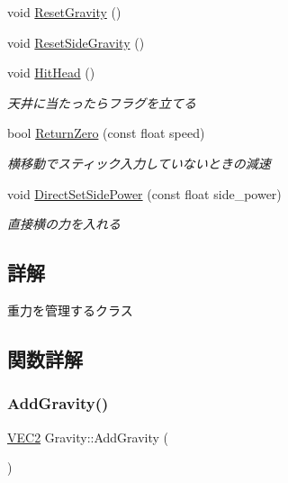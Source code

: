 \begin{DoxyCompactItemize}
void \mbox{\hyperlink{class_gravity_aa334a7ebbbd79ca28e7d29c3fc5c03ed}{Reset\+Gravity}} ()
\item 
void \mbox{\hyperlink{class_gravity_a5e430e10dea748f20c2d019e86dd339c}{Reset\+Side\+Gravity}} ()
\item 
void \mbox{\hyperlink{class_gravity_a56fa68b18b0426bdb267850e1917eb05}{Hit\+Head}} ()
\begin{DoxyCompactList}\small\item\em 天井に当たったらフラグを立てる \end{DoxyCompactList}\item 
bool \mbox{\hyperlink{class_gravity_a1efc862b822ca8cfea80b066ed4479f9}{Return\+Zero}} (const float speed)
\begin{DoxyCompactList}\small\item\em 横移動でスティック入力していないときの減速 \end{DoxyCompactList}\item 
void \mbox{\hyperlink{class_gravity_a015bda4dc0019baaa70378e1d6715a55}{Direct\+Set\+Side\+Power}} (const float side\+\_\+power)
\begin{DoxyCompactList}\small\item\em 直接横の力を入れる \end{DoxyCompactList}\end{DoxyCompactItemize}


\subsection{詳解}
重力を管理するクラス 

\subsection{関数詳解}
\mbox{\label{class_gravity_a310540f600900ee0b93f7e84dd2f2b26}} 
\subsubsection{\texorpdfstring{Add\+Gravity()}{AddGravity()}}
{\footnotesize\ttfamily \mbox{\hyperlink{common_8h_afb0c5e21d4133ff4f200992c0b534e1b}{V\+E\+C2}} Gravity\+::\+Add\+Gravity (\begin{DoxyParamCaption}{ }\end{DoxyParamCaption})}



